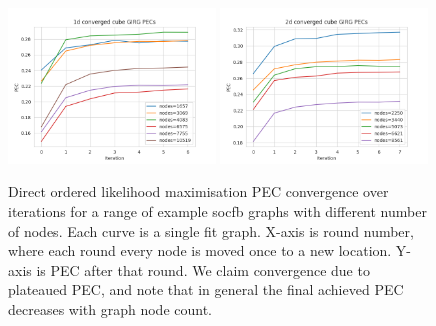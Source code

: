\begin{figure}
  \centering
  \includegraphics[width=0.49\textwidth]{figures/mcmc_ordered_1d_pec_convergence.png}
  \includegraphics[width=0.49\textwidth]{figures/mcmc_ordered_2d_pec_convergence.png}
  \caption{Direct ordered likelihood maximisation PEC convergence over iterations for a range of example socfb graphs with different number of nodes. Each curve is a single fit graph. X-axis is round number, where each round every node is moved once to a new location. Y-axis is PEC after that round. We claim convergence due to plateaued PEC, and note that in general the final achieved PEC decreases with graph node count.}
  \label{fig:direct_ordered_pec_convergence_curves}
\end{figure}





